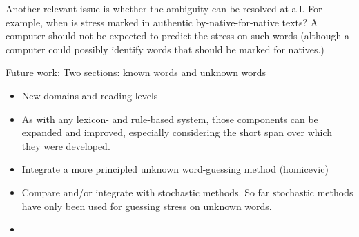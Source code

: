 \documentclass[11pt]{article}
\begin{document}
Another relevant issue is whether the ambiguity can be resolved at all. For example, when is stress marked in 
authentic by-native-for-native texts? A computer should not be expected to predict the stress on 
such words (although a computer could possibly identify words that should be marked for 
natives.) 

Future work:
Two sections: known words and unknown words
\begin{itemize}
\item New domains and reading levels
\item As with any lexicon- and rule-based system, those components can be expanded and improved, especially considering the short span over which they were developed.
\item Integrate a more principled unknown word-guessing method (homicevic)
\item Compare and/or integrate with stochastic methods. So far stochastic
methods have only been used for guessing stress on unknown words.
\item 

\end{itemize}
%



\end{document}
